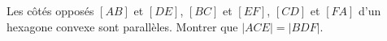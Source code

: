Les côtés opposés $[AB]$ et $[DE]$, $[BC]$ et $[EF]$, $[CD]$ et $[FA]$ d'un hexagone convexe sont parallèles. Montrer que $|ACE| = |BDF|$.
